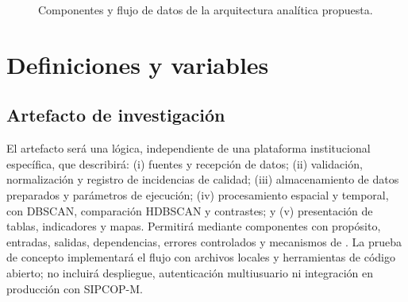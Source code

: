 \begin{figure}[H]
\centering
\caption{Componentes y flujo de datos de la arquitectura analítica propuesta.}
\label{fig:flujo}
\end{figure}

\section{Definiciones y variables}

\subsection{Artefacto de investigación}

El artefacto será una  lógica, independiente de una plataforma institucional específica, que describirá: (i) fuentes y recepción de datos; (ii) validación, normalización y registro de incidencias de calidad; (iii) almacenamiento de datos preparados y parámetros de ejecución; (iv) procesamiento espacial y temporal, con DBSCAN, comparación HDBSCAN y contrastes; y (v) presentación de tablas, indicadores y mapas. Permitirá   mediante componentes con propósito, entradas, salidas, dependencias, errores controlados y mecanismos de . La prueba de concepto implementará el flujo con archivos locales y herramientas de código abierto; no incluirá despliegue, autenticación multiusuario ni integración en producción con SIPCOP-M.

